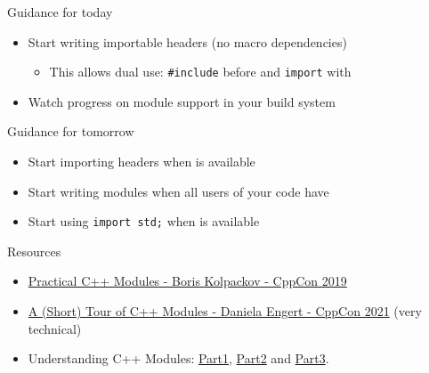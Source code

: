 \begin{frame}[fragile]
    \begin{exampleblock}{Guidance for today}
      \begin{itemize}
        \item Start writing importable headers (no macro dependencies)
        \begin{itemize}
          \item This allows dual use: \texttt{#include} before  and \texttt{import} with 
        \end{itemize}
        \item Watch progress on module support in your build system
      \end{itemize}
    \end{exampleblock}
    \begin{exampleblock}{Guidance for tomorrow}
      \begin{itemize}
        \item Start importing headers when  is available
        \item Start writing modules when all users of your code have 
        \item Start using \texttt{import std;} when  is available
      \end{itemize}
    \end{exampleblock}
\end{frame}

\begin{frame}[fragile]
    \begin{block}{Resources}
      \begin{itemize}
      \item \href{https://www.youtube.com/watch?v=szHV6RdQdg8}{Practical C++ Modules - Boris Kolpackov - CppCon 2019}
      \item \href{https://www.youtube.com/watch?v=nP8QcvPpGeM}{A (Short) Tour of C++ Modules - Daniela Engert - CppCon 2021} (very technical)
      \item Understanding C++ Modules: \href{https://vector-of-bool.github.io/2019/03/10/modules-1.html}{Part1}, \href{https://vector-of-bool.github.io/2019/03/31/modules-2.html}{Part2} and \href{https://vector-of-bool.github.io/2019/10/07/modules-3.html}{Part3}.
      \end{itemize}
    \end{block}
\end{frame}

